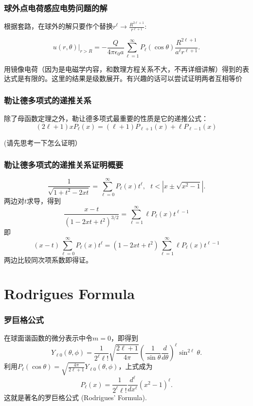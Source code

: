 \documentclass[CJK]{beamer}
\begin{document}
\begin{frame}
\frametitle{球外点电荷感应电势问题的解}

根据套路，在球外的解只要作个替换$r^\ell \rightarrow \frac{R^{2\ell +1}}{r^{\ell+1}}$:

$$\left. u(r, \theta)\right\vert_{r>R} = - \frac{Q}{4\pi\epsilon_0a}\sum_{\ell= 1}^\infty P_{\ell}(\cos\theta)\frac{R^{2\ell+1}}{a^\ell r^{\ell +1}}. $$

用镜像电荷（因为是电磁学内容，和数理方程关系不大，不再详细讲解）得到的表达式是有限的。这里的结果是级数展开。有兴趣的话可以尝试证明两者互相等价

\end{frame}




\begin{frame}
\frametitle{勒让德多项式的递推关系}

除了母函数定理之外，勒让德多项式最重要的性质是它的递推公式：
\tbox
    {$$ (2\ell+1)xP_\ell(x) = (\ell+1)P_{\ell+1}(x)+\ell P_{\ell-1}(x)$$ }

    (请先思考一下怎么证明）

\end{frame}

\begin{frame}
\frametitle{勒让德多项式的递推关系证明概要}

  $$ \frac{1}{\sqrt{1+t^2-2xt}} = \sum_{\ell =0}^\infty P_\ell (x) t^\ell,\ \ \ t<|x\pm \sqrt{x^2-1}|  .$$
两边对$t$求导，得到
$$ \frac{x-t}{(1-2xt+t^2)^{3/2}} =  \sum_{\ell = 1}^\infty \ell P_\ell(x)t^{\ell-1}$$
即
$$(x-t)\sum_{\ell=0}^\infty P_\ell(x)t^\ell  = (1-2xt+t^2)\sum_{\ell=1}^\infty \ell P_\ell(x)t^{\ell-1}$$
两边比较同次项系数即得证。

\end{frame}


\section{Rodrigues Formula}


\begin{frame}
  \frametitle{罗巨格公式}
  
  在球面谐函数的微分表示中令$m=0$，即得到
  $$ Y_{\ell 0}(\theta, \phi) = \frac{1}{2^\ell \ell!}\sqrt{\frac{2\ell+1}{4\pi}} \left(\frac{1}{\sin\theta}\frac{d}{d\theta}\right)^\ell \sin^{2\ell}\theta. $$
  利用$P_\ell(\cos\theta) = \sqrt{\frac{4\pi}{2\ell+1}}Y_{\ell 0}(\theta,\phi)$，上式成为
  \tbox
  {\blue  $$P_\ell(x) = \frac{1}{2^\ell \ell!}\frac{d^\ell}{dx^\ell}(x^2-1)^\ell.$$}
    这就是著名的{\blue 罗巨格公式 (Rodrigues' Formula)}.
  
  
\end{frame}
\end{document}
